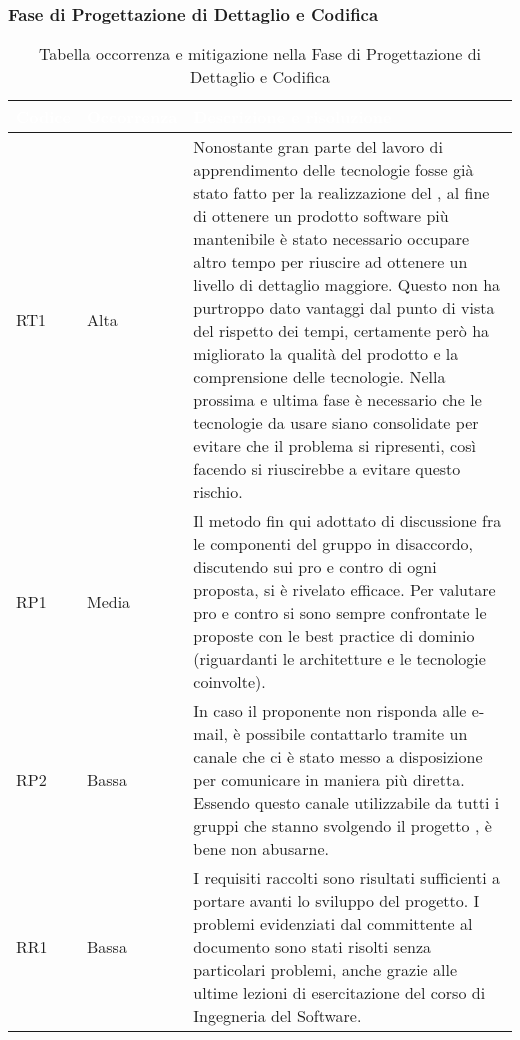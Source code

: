 \subsubsection{Fase di Progettazione di Dettaglio e Codifica}
{
\renewcommand{\arraystretch}{2}
\centering
\begin{longtable}{C{2cm} C{3cm} C{10cm}}
\caption{Tabella occorrenza e mitigazione nella Fase di Progettazione di Dettaglio e Codifica}\\

\textcolor{white}{\textbf{Codice}} & 
\textcolor{white}{\textbf{Occorrenza}} & 
\textcolor{white}{\textbf{Descrizione e risoluzione}}\\	
\endhead

RT1 &
Alta &
Nonostante gran parte del lavoro di apprendimento delle tecnologie fosse già stato fatto per la realizzazione del , al fine di ottenere un prodotto software più mantenibile è stato necessario occupare altro tempo per riuscire ad ottenere un livello di dettaglio maggiore. Questo non ha purtroppo dato vantaggi dal punto di vista del rispetto dei tempi, certamente però ha migliorato la qualità del prodotto e la comprensione delle tecnologie. Nella prossima e ultima fase è necessario che le tecnologie da usare siano consolidate per evitare che il problema si ripresenti, così facendo si riuscirebbe a evitare questo rischio. \\

RP1 &
Media &
Il metodo fin qui adottato di discussione fra le componenti del gruppo in disaccordo, discutendo sui pro e contro di ogni proposta, si è rivelato efficace. Per valutare pro e contro si sono sempre confrontate le proposte con le best practice di dominio (riguardanti le architetture e le tecnologie coinvolte). \\

RP2 &
Bassa &
In caso il proponente non risponda alle e-mail, è possibile contattarlo tramite un canale  che ci è stato messo a disposizione per comunicare in maniera più diretta. Essendo questo canale utilizzabile da tutti i gruppi che stanno svolgendo il progetto \NomeProgetto{}, è bene non abusarne. \\

RR1 &
Bassa &
I requisiti raccolti sono risultati sufficienti a portare avanti lo sviluppo del progetto. I problemi evidenziati dal committente al documento \AdR{} sono stati risolti senza particolari problemi, anche grazie alle ultime lezioni di esercitazione del corso di Ingegneria del Software. \\


\end{longtable}}
